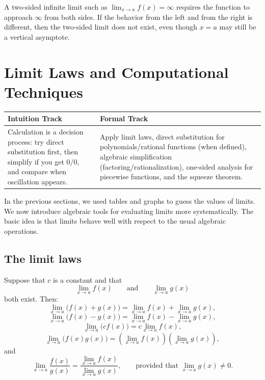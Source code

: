 \begin{remark}
A two-sided infinite limit such as \(\displaystyle \lim_{x\to a}f(x)=\infty\) requires the function to approach \(\infty\) from both sides. If the behavior from the left and from the right is different, then the two-sided limit does not exist, even though \(x=a\) may still be a vertical asymptote.
\end{remark}

\section{Limit Laws and Computational Techniques}

\begin{center}
\renewcommand{\arraystretch}{1.2}
\begin{tabular}{|p{}|p{}|}
\hline
\textbf{Intuition Track} & \textbf{Formal Track} \\
\hline
Calculation is a decision process: try direct substitution first, then simplify if you get \(0/0\), and compare when oscillation appears. & Apply limit laws, direct substitution for polynomials/rational functions (when defined), algebraic simplification (factoring/rationalization), one-sided analysis for piecewise functions, and the squeeze theorem. \\
\hline
\end{tabular}
\end{center}

In the previous sections, we used tables and graphs to guess the values of limits. We now introduce algebraic tools for evaluating limits more systematically. The basic idea is that limits behave well with respect to the usual algebraic operations.

\subsection{The limit laws}

\begin{theorem}
Suppose that \(c\) is a constant and that
\[
\lim_{x\to a}f(x)
\qquad \text{and} \qquad
\lim_{x\to a}g(x)
\]
both exist. Then:
\[
\lim_{x\to a}\bigl(f(x)+g(x)\bigr)
=
\lim_{x\to a}f(x)+\lim_{x\to a}g(x),
\]
\[
\lim_{x\to a}\bigl(f(x)-g(x)\bigr)
=
\lim_{x\to a}f(x)-\lim_{x\to a}g(x),
\]
\[
\lim_{x\to a}\bigl(c f(x)\bigr)
=
c\lim_{x\to a}f(x),
\]
\[
\lim_{x\to a}\bigl(f(x)g(x)\bigr)
=
\left(\lim_{x\to a}f(x)\right)\left(\lim_{x\to a}g(x)\right),
\]
and
\[
\lim_{x\to a}\frac{f(x)}{g(x)}
=
\frac{\lim_{x\to a}f(x)}{\lim_{x\to a}g(x)},
\qquad
\text{provided that } \lim_{x\to a}g(x)\ne 0.
\]
\end{theorem}

